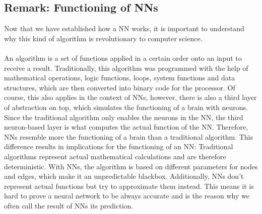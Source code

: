 \documentclass[11pt]{report}
\begin{document}
            \subsection{Remark: Functioning of NNs}\label{subsec:remark-about-the-funtioning-of-nns}
    Now that we have established how a NN works, it is important to understand why this kind of algorithm is revolutionary to computer science.
    \\ \\
    An algorithm is a set of functions applied in a certain order onto an input to receive a result.
    Traditionally, this algorithm was programmed with the help of mathematical operations, logic functions, loops, system functions and data structures, which are then converted into binary code for the processor.
    Of course, this also applies in the context of NNs, however, there is also a third layer of abstraction on top, which simulates the functioning of a brain with neurons.
    Since the traditional algorithm only enables the neurons in the NN, the third neuron-based layer is what computes the actual function of the NN\@.
    Therefore, NNs resemble more the functioning of a brain than a traditional algorithm.
    This difference results in implications for the functioning of an NN:
    Traditional algorithms represent actual mathematical calculations and are therefore deterministic.
    With NNs, the algorithm is based on different parameters for nodes and edges, which make it an unpredictable blackbox.
    Additionally, NNs don't represent actual functions but try to approximate them instead.
    This means it is hard to prove a neural network to be always accurate and is the reason why we often call the result of NNs its prediction.
\end{document}

